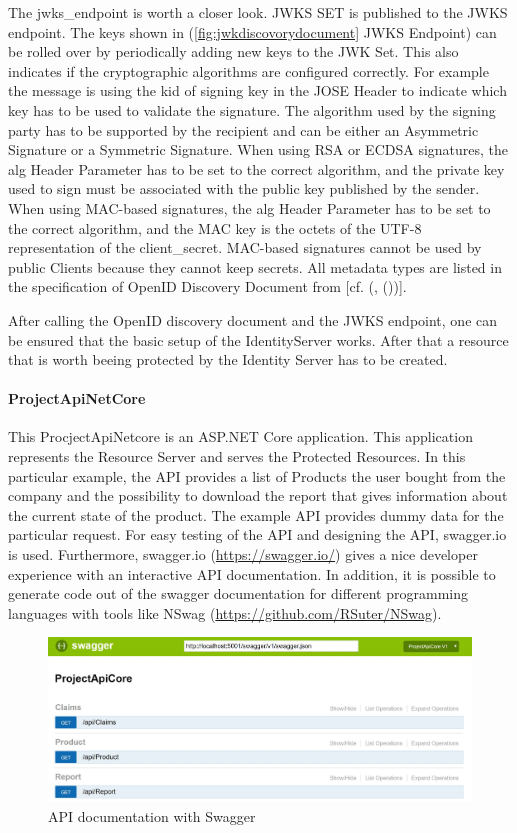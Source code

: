 The jwks\_endpoint is worth a closer look. JWKS SET is published to the JWKS endpoint. The keys shown in (\ref{fig:jwkdiscovorydocument} JWKS Endpoint) can be rolled over by periodically adding new keys to the JWK Set. This also indicates if the cryptographic algorithms are configured correctly. For example the message is using the kid of signing key in the JOSE Header to indicate which key has to be used to validate the signature. The algorithm used by the signing party has to be supported by the recipient and can be either an Asymmetric Signature or a Symmetric Signature. 
When using RSA or ECDSA signatures, the alg Header Parameter has to be set to the correct algorithm, and the private key used to sign must be associated with the public key published by the sender. When using MAC-based signatures, the alg Header Parameter has to be set to the correct algorithm, and the MAC key is the octets of the UTF-8 representation of the client\_secret. MAC-based signatures cannot be used by public Clients because they cannot keep secrets.  All metadata types are listed in the specification of OpenID Discovery Document from \cite{Sakimura:OIDCD} [cf. (\cite{Sakimura:OIDCC}, (\cite{Sakimura:OIDCD}))]. 

After calling the OpenID discovery document and the JWKS endpoint, one can be ensured that the basic setup of the IdentityServer works. After that a resource that is worth beeing protected by the Identity Server has to be created. 

\paragraph{ProjectApiNetCore}

This ProcjectApiNetcore is an ASP.NET Core application. This application represents the Resource Server and serves the Protected Resources. In this particular example, the API provides a list of Products the user bought from the company and the possibility to download the report that gives information about the current state of the product. The example API provides dummy data for the particular request. For easy testing of the API and designing the API, swagger.io is used. Furthermore, swagger.io (\url{https://swagger.io/}) gives a nice developer experience with an interactive API documentation. In addition, it is possible to generate code out of the swagger documentation for different programming languages with tools like NSwag (\url{https://github.com/RSuter/NSwag}).

\begin{figure}[h]
	\centering
	\includegraphics[width=0.7\linewidth]{images/apis}
	\caption{API documentation with Swagger}
	\label{fig:apis}
\end{figure}

